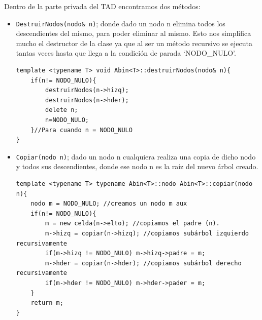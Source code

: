 Dentro de la parte privada del TAD encontramos dos métodos:
\begin{itemize}
  \item \verb|DestruirNodos(nodo& n)|; donde dado un nodo n elimina todos los descendientes del mismo, para poder eliminar al mismo. Esto nos simplifica mucho el destructor de la clase ya que al ser un método recursivo se ejecuta tantas veces hasta que llega a la condición de parada `NODO\_NULO'.
  \begin{verbatim}
template <typename T> void Abin<T>::destruirNodos(nodo& n){
	if(n!= NODO_NULO){
		destruirNodos(n->hizq);
		destruirNodos(n->hder);
		delete n;
		n=NODO_NULO;
	}//Para cuando n = NODO_NULO
}
  \end{verbatim}
  \item \verb|Copiar(nodo n)|; dado un nodo n cualquiera realiza una copia de dicho nodo y todos sus descendientes, donde ese nodo n es la raíz del nuevo árbol creado.
  \begin{verbatim}
template <typename T> typename Abin<T>::nodo Abin<T>::copiar(nodo n){
	nodo m = NODO_NULO; //creamos un nodo m aux
	if(n!= NODO_NULO){
		m = new celda(n->elto); //copiamos el padre (n).
		m->hizq = copiar(n->hizq); //copiamos subárbol izquierdo recursivamente
		if(m->hizq != NODO_NULO) m->hizq->padre = m;
		m->hder = copiar(n->hder); //copiamos subárbol derecho recursivamente
		if(m->hder != NODO_NULO) m->hder->pader = m;
	}
	return m;
}
  \end{verbatim}
\end{itemize}